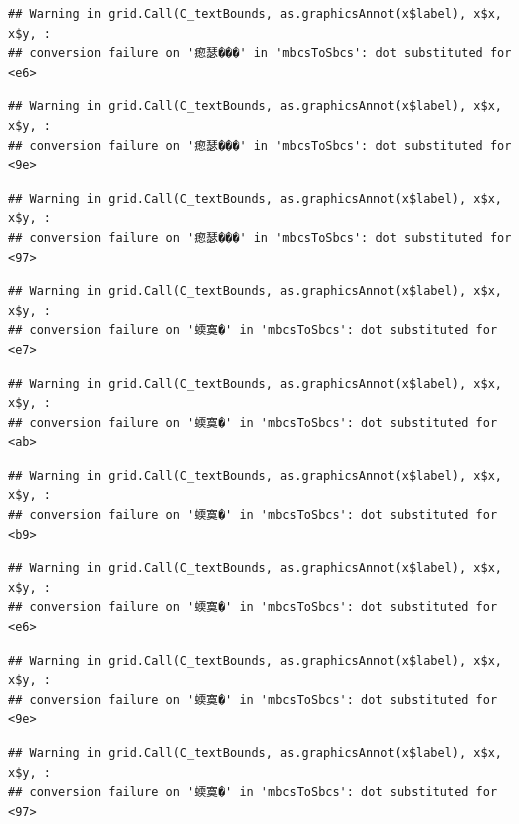 \documentclass[
]{article}
\begin{document}
\begin{verbatim}
## Warning in grid.Call(C_textBounds, as.graphicsAnnot(x$label), x$x, x$y, :
## conversion failure on '瘛瑟���' in 'mbcsToSbcs': dot substituted for <e6>
\end{verbatim}

\begin{verbatim}
## Warning in grid.Call(C_textBounds, as.graphicsAnnot(x$label), x$x, x$y, :
## conversion failure on '瘛瑟���' in 'mbcsToSbcs': dot substituted for <9e>
\end{verbatim}

\begin{verbatim}
## Warning in grid.Call(C_textBounds, as.graphicsAnnot(x$label), x$x, x$y, :
## conversion failure on '瘛瑟���' in 'mbcsToSbcs': dot substituted for <97>
\end{verbatim}

\begin{verbatim}
## Warning in grid.Call(C_textBounds, as.graphicsAnnot(x$label), x$x, x$y, :
## conversion failure on '蝡寞�' in 'mbcsToSbcs': dot substituted for <e7>
\end{verbatim}

\begin{verbatim}
## Warning in grid.Call(C_textBounds, as.graphicsAnnot(x$label), x$x, x$y, :
## conversion failure on '蝡寞�' in 'mbcsToSbcs': dot substituted for <ab>
\end{verbatim}

\begin{verbatim}
## Warning in grid.Call(C_textBounds, as.graphicsAnnot(x$label), x$x, x$y, :
## conversion failure on '蝡寞�' in 'mbcsToSbcs': dot substituted for <b9>
\end{verbatim}

\begin{verbatim}
## Warning in grid.Call(C_textBounds, as.graphicsAnnot(x$label), x$x, x$y, :
## conversion failure on '蝡寞�' in 'mbcsToSbcs': dot substituted for <e6>
\end{verbatim}

\begin{verbatim}
## Warning in grid.Call(C_textBounds, as.graphicsAnnot(x$label), x$x, x$y, :
## conversion failure on '蝡寞�' in 'mbcsToSbcs': dot substituted for <9e>
\end{verbatim}

\begin{verbatim}
## Warning in grid.Call(C_textBounds, as.graphicsAnnot(x$label), x$x, x$y, :
## conversion failure on '蝡寞�' in 'mbcsToSbcs': dot substituted for <97>
\end{verbatim}
\end{document}
